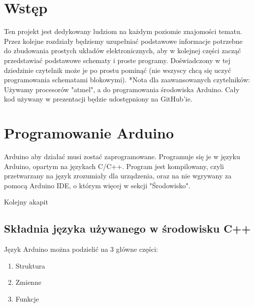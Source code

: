 \documentclass[a4paper,12pt, twoside]{article}
\let\oldsection\section		%
\renewcommand\section{\clearpage\oldsection}%
\begin{document}

\tableofcontents 
{}
\thispagestyle {empty}

\section*{Wstęp}
Ten projekt jest dedykowany ludziom na każdym poziomie znajomości tematu. Przez kolejne rozdziały będziemy uzupełniać podstawowe informacje potrzebne do zbudowania prostych układów elektronicznych, aby w kolejnej części zacząć przedstawiać podstawowe schematy i proste programy. Doświadczony w tej dziedzinie czytelnik może je po prostu pominąć (nie wszyscy chcą się uczyć programowania schematami blokowymi). 
*Nota dla zaawansowanych czytelników:
Używamy procesorów "atmel", a do programowania środowiska Arduino. Cały kod używany w prezentacji będzie udostępniony na GitHub'ie.

\section{Programowanie Arduino}

Arduino aby działać musi zostać zaprogramowane. Programuje się je w języku Arduino, opartym na językach C/C++.
Program jest kompilowany, czyli przetwarzany na język zrozumiały dla urządzenia, oraz na nie wgrywany za pomocą
Arduino IDE, o którym więcej w sekcji "Środowisko". 

Kolejny akapit

\subsection {Składnia języka używanego w środowisku C++}
  Język Arduino można podzielić na 3 główne części:
  \begin{enumerate}
	\item Struktura
	\item Zmienne
	\item Funkcje
\end{enumerate}
\end{document}
